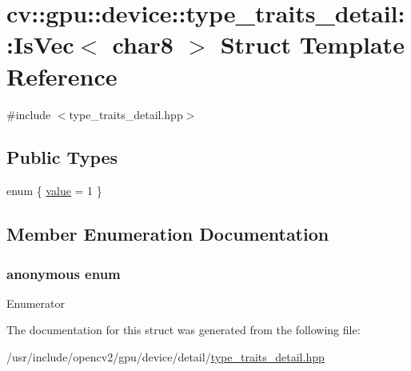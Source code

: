 \hypertarget{structcv_1_1gpu_1_1device_1_1type__traits__detail_1_1IsVec_3_01char8_01_4}{\section{cv\-:\-:gpu\-:\-:device\-:\-:type\-\_\-traits\-\_\-detail\-:\-:Is\-Vec$<$ char8 $>$ Struct Template Reference}
\label{structcv_1_1gpu_1_1device_1_1type__traits__detail_1_1IsVec_3_01char8_01_4}
}


{\ttfamily \#include $<$type\-\_\-traits\-\_\-detail.\-hpp$>$}

\subsection*{Public Types}
\begin{DoxyCompactItemize}
\item 
enum \{ \hyperlink{structcv_1_1gpu_1_1device_1_1type__traits__detail_1_1IsVec_3_01char8_01_4_abf191a05d806c5388d86d3e3442abd1ba8e1dabfa9bc133ea0c82360f529ee173}{value} = 1
 \}
\end{DoxyCompactItemize}


\subsection{Member Enumeration Documentation}
\hypertarget{structcv_1_1gpu_1_1device_1_1type__traits__detail_1_1IsVec_3_01char8_01_4_abf191a05d806c5388d86d3e3442abd1b}{\subsubsection[{anonymous enum}]{\setlength{\rightskip}{0pt plus 5cm}anonymous enum}}\label{structcv_1_1gpu_1_1device_1_1type__traits__detail_1_1IsVec_3_01char8_01_4_abf191a05d806c5388d86d3e3442abd1b}
\begin{Desc}
\item[Enumerator]\par
\begin{description}
\item[{\em 
\hypertarget{structcv_1_1gpu_1_1device_1_1type__traits__detail_1_1IsVec_3_01char8_01_4_abf191a05d806c5388d86d3e3442abd1ba8e1dabfa9bc133ea0c82360f529ee173}{value}\label{structcv_1_1gpu_1_1device_1_1type__traits__detail_1_1IsVec_3_01char8_01_4_abf191a05d806c5388d86d3e3442abd1ba8e1dabfa9bc133ea0c82360f529ee173}
}]\end{description}
\end{Desc}


The documentation for this struct was generated from the following file\-:\begin{DoxyCompactItemize}
\item 
/usr/include/opencv2/gpu/device/detail/\hyperlink{type__traits__detail_8hpp}{type\-\_\-traits\-\_\-detail.\-hpp}\end{DoxyCompactItemize}
